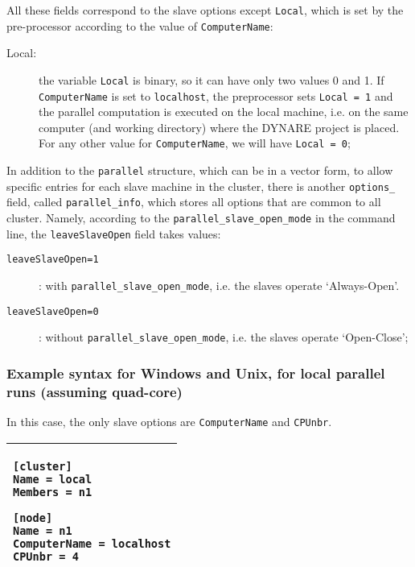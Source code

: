 \documentclass[12pt,a4paper,pdftex]{article}
\begin{document}
All these fields correspond to the slave options except \verb"Local", which is set by the pre-processor according to the value of \verb"ComputerName":	
\begin{description}
\item[Local:] the variable \verb"Local" is binary, so it can have only two values 0 and 1. If \verb"ComputerName" is set to \verb"localhost", the preprocessor sets \verb"Local = 1" and the parallel computation is executed on the local machine, i.e. on the same computer (and working directory) where the DYNARE project is placed. For any other value for \verb"ComputerName", we will have \verb"Local = 0";
\end{description}

In addition to the \verb"parallel" structure, which can be in a vector form, to allow specific entries for each slave machine in the cluster, there is another \verb"options_" field, called \verb"parallel_info", which stores all options that are common to all cluster. Namely, according to the \verb"parallel_slave_open_mode" in the command line, the \verb"leaveSlaveOpen" field takes values:
\begin{description}
\item[\texttt{leaveSlaveOpen=1}]: with \verb"parallel_slave_open_mode", i.e. the slaves operate `Always-Open'.
\item[\texttt{leaveSlaveOpen=0}]: without \verb"parallel_slave_open_mode", i.e. the slaves operate `Open-Close';
\end{description}


\subsubsection{Example syntax for Windows and Unix, for local parallel runs (assuming quad-core)}
In this case, the only slave options are \verb"ComputerName" and \verb"CPUnbr".

\singlespacing
{\footnotesize
\hspace{2cm}\begin{tabular}[b]{| p{8cm} |}
  \hline
\begin{verbatim}
[cluster]
Name = local
Members = n1

[node]
Name = n1
ComputerName = localhost
CPUnbr = 4
\end{verbatim}
\\ \hline
\end{tabular}
}
\doublespacing
\end{document}

